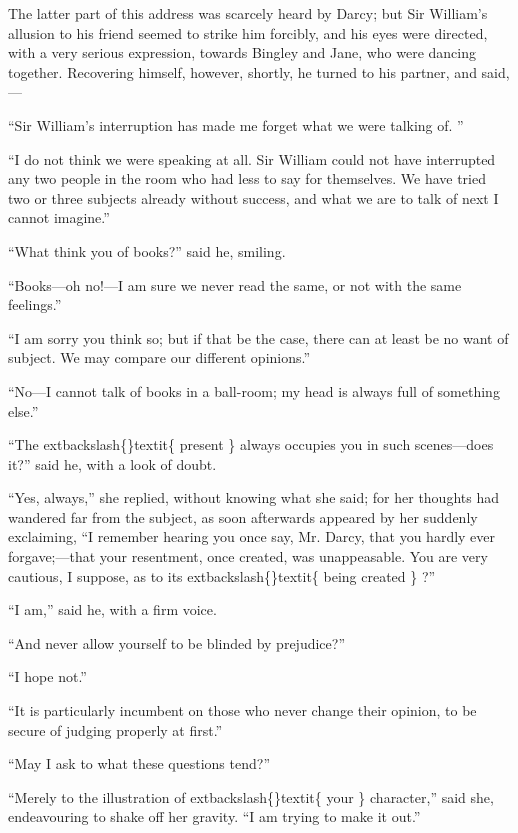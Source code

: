 \documentclass[10pt]{book}
\begin{document}
   The latter part of this address was scarcely heard by Darcy; but Sir
William’s allusion to his friend seemed to strike him forcibly, and his
eyes were directed, with a very serious expression, towards Bingley and
Jane, who were dancing together. Recovering himself, however, shortly,
he turned to his partner, and said,—
  

   “Sir William’s interruption has made me forget what we were talking
of.
   ”
  

   “I do not think we were speaking at all. Sir William could not have
interrupted any two people in the room who had less to say for
themselves. We have tried two or three subjects already without success,
and what we are to talk of next I cannot imagine.”
  

   “What think you of books?” said he, smiling.
  

   “Books—oh no!—I am sure we never read the same, or not with the same
feelings.”
  

   “I am sorry you think so; but if that be the case, there can at least be
no want of subject. We may compare our different opinions.”
  

   “No—I cannot talk of books in a ball-room; my head is always full of
something else.”
  

   “The
   	extbackslash\{\}textit\{
    present
   \}
   always occupies you in such scenes—does it?” said he,
with a look of doubt.
  

   “Yes, always,” she replied, without knowing what she said; for her
thoughts had wandered far from the subject, as soon afterwards appeared
by her suddenly exclaiming, “I remember hearing you once say, Mr. Darcy,
that you hardly ever forgave;—that your resentment, once created, was
unappeasable. You are very cautious, I suppose, as to its
   	extbackslash\{\}textit\{
    being
created
   \}
   ?”
  

   “I am,” said he, with a firm voice.
  

   “And never allow yourself to be blinded by prejudice?”
  

   “I hope not.”
  

   “It is particularly incumbent on those who never change their opinion,
to be secure of judging properly at first.”
  

   “May I ask to what these questions tend?”
  

   “Merely to the illustration of
   	extbackslash\{\}textit\{
    your
   \}
   character,” said she, endeavouring
to shake off her gravity. “I am trying to make it out.”
  
\end{document}
